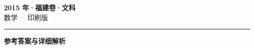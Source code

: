 \documentclass[zihao=5, a4paper]{ctexart}
\begin{document}
\begin{center}
  {\Large\bfseries 2015 年·福建卷·文科}\\[4pt]
  {\large 数学 · 印刷版}
\end{center}
\medskip
{}

\par\bigskip\hrule\bigskip
{}
\begin{center}{\large\bfseries 参考答案与详细解析}\end{center}
\smallskip

\end{document}
